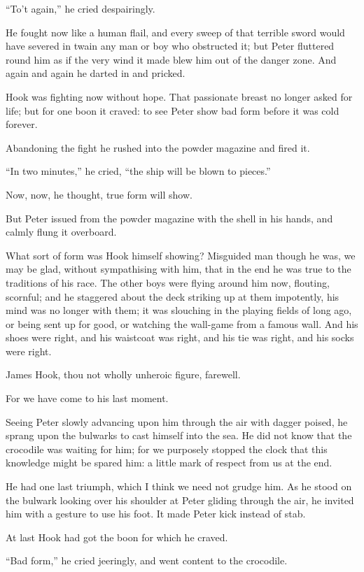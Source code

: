 ``To't again,'' he cried despairingly.

He fought now like a human flail, and every sweep of that terrible
sword would have severed in twain any man or boy who obstructed it; but
Peter fluttered round him as if the very wind it made blew him out of
the danger zone. And again and again he darted in and pricked.

Hook was fighting now without hope. That passionate breast no longer
asked for life; but for one boon it craved: to see Peter show bad form
before it was cold forever.

Abandoning the fight he rushed into the powder magazine and fired it.

``In two minutes,'' he cried, ``the ship will be blown to pieces.''

Now, now, he thought, true form will show.

But Peter issued from the powder magazine with the shell in his hands,
and calmly flung it overboard.

What sort of form was Hook himself showing? Misguided man though he
was, we may be glad, without sympathising with him, that in the end he
was true to the traditions of his race. The other boys were flying
around him now, flouting, scornful; and he staggered about the deck
striking up at them impotently, his mind was no longer with them; it
was slouching in the playing fields of long ago, or being sent up for
good, or watching the wall-game from a famous wall. And his shoes were
right, and his waistcoat was right, and his tie was right, and his
socks were right.

James Hook, thou not wholly unheroic figure, farewell.

For we have come to his last moment.

Seeing Peter slowly advancing upon him through the air with dagger
poised, he sprang upon the bulwarks to cast himself into the sea. He
did not know that the crocodile was waiting for him; for we purposely
stopped the clock that this knowledge might be spared him: a little
mark of respect from us at the end.

He had one last triumph, which I think we need not grudge him. As he
stood on the bulwark looking over his shoulder at Peter gliding through
the air, he invited him with a gesture to use his foot. It made Peter
kick instead of stab.

At last Hook had got the boon for which he craved.

``Bad form,'' he cried jeeringly, and went content to the crocodile.


